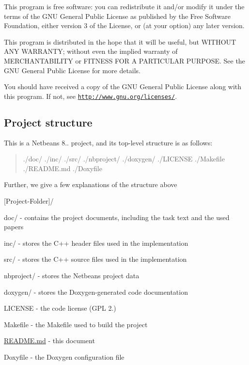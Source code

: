 This program is free software\+: you can redistribute it and/or modify it under the terms of the G\+N\+U General Public License as published by the Free Software Foundation, either version 3 of the License, or (at your option) any later version.

This program is distributed in the hope that it will be useful, but W\+I\+T\+H\+O\+U\+T A\+N\+Y W\+A\+R\+R\+A\+N\+T\+Y; without even the implied warranty of M\+E\+R\+C\+H\+A\+N\+T\+A\+B\+I\+L\+I\+T\+Y or F\+I\+T\+N\+E\+S\+S F\+O\+R A P\+A\+R\+T\+I\+C\+U\+L\+A\+R P\+U\+R\+P\+O\+S\+E. See the G\+N\+U General Public License for more details.

You should have received a copy of the G\+N\+U General Public License along with this program. If not, see \href{http://www.gnu.org/licenses/}{\tt http\+://www.\+gnu.\+org/licenses/}.

\subsection*{Project structure}

This is a Netbeans 8.. project, and its\textquotesingle{} top-\/level structure is as follows\+:

\begin{quote}
./doc/ ./inc/ ./src/ ./nbproject/ ./doxygen/ ./\+L\+I\+C\+E\+N\+S\+E ./\+Makefile ./\+R\+E\+A\+D\+M\+E.md ./\+Doxyfile \end{quote}


Further, we give a few explanations of the structure above


\begin{DoxyItemize}
\item \mbox{[}Project-\/\+Folder\mbox{]}/
\begin{DoxyItemize}
\item doc/ -\/ contains the project documents, including the task text and the used papers
\item inc/ -\/ stores the C++ header files used in the implementation
\item src/ -\/ stores the C++ source files used in the implementation
\item nbproject/ -\/ stores the Netbeans project data
\item doxygen/ -\/ stores the Doxygen-\/generated code documentation
\item L\+I\+C\+E\+N\+S\+E -\/ the code license (G\+P\+L 2.)
\item Makefile -\/ the Makefile used to build the project
\item \hyperlink{_r_e_a_d_m_e_8md}{R\+E\+A\+D\+M\+E.\+md} -\/ this document
\item Doxyfile -\/ the Doxygen configuration file
\end{DoxyItemize}
\end{DoxyItemize}

